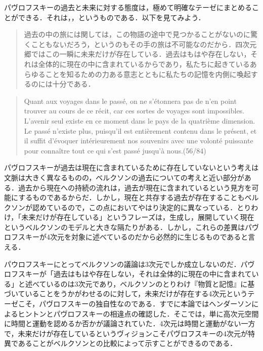 パヴロフスキーの過去と未来に対する態度は，極めて明確なテーゼにまとめることができる．それは，，というものである．以下を見てみよう．
\begin{quote}
過去の中の旅には関しては，この物語の途中で見つかることがないのに驚くこともないだろう，というのもその手の旅は不可能なのだから．四次元郷ではこの一瞬に未来だけが存在している．過去はもはや存在しない，それは全体的に現在の中に含まれているからであり，私たちに起きているあらゆることを知るための力ある意志とともに私たちの記憶を内側に喚起するのには十分である．
\end{quote}
\begin{quote}
Quant aux voyages dans le passé, on ne s'étonnera pas de n'en point trouver au cours de ce récit, car ces sortes de voyages sont impossibles. L'avenir seul existe en ce moment dans le pays de la quatrième dimension. Le passé n'existe plus, puisqu'il est entièrement contenu dans le présent, et il suffit d'évoquer intérieurement nos souvenirs avec une volonté puissante pour connaître tout ce qui s'est passé jusqu'à nous.(56/84)
\end{quote}
パヴロフスキーが過去は現在に含まれているために存在していないという考えは文脈は大きく異なるものの，ベルクソンの過去についての考えと近い部分がある．過去から現在への持続の流れは，過去が現在に含まれているという見方を可能にするものであるからだ．しかし，現在と共存する過去が存在することもベルクソンが認めているので，この点においてやはり決定的に異なっている．とりわけ，「未来だけが存在している」というフレーズは，生成し，展開していく現在というベルクソンのモデルと大きな隔たりがある．しかし，これらの差異はパヴロフスキーが4次元を対象に述べているのだから必然的に生じるものであると言える．

パウロフスキーにとってベルクソンの議論は3次元でしか成立しないのだ．パヴロフスキーが「過去はもはや存在しない，それは全体的に現在の中に含まれている」と述べているのは3次元であり，ベルクソンのとりわけ『物質と記憶』に基づいていることをうかがわせるのに対して，未来だけが存在する4次元というテーゼこそ，パヴロフスキーの独自性なのである．すでに本論ではヘンダーソンによるヒントンとパヴロフスキーの相違点の確認した．そこでは，単に高次元空間に時間と運動を認めるか否かが議論されていた．4次元は時間と運動がない一方で，未来だけが存在しているというヴィジョンこそパヴロフスキーの4次元が特異であることがベルクソンとの比較によって示すことができるのである．

